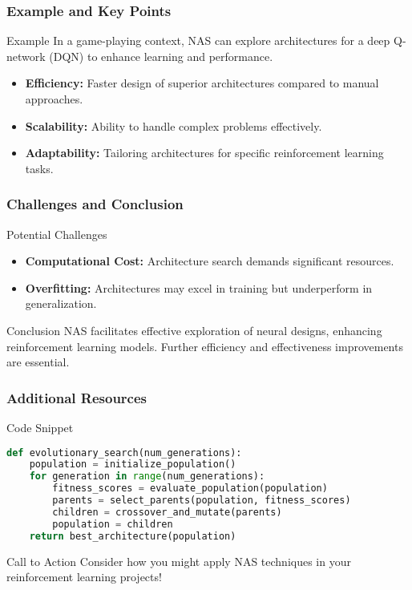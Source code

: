 \documentclass[aspectratio=169]{beamer}
\begin{document}
\begin{frame}[fragile]
    \frametitle{Example and Key Points}
    \begin{block}{Example}
        In a game-playing context, NAS can explore architectures for a deep Q-network (DQN) to enhance learning and performance.
    \end{block}
    
    \begin{itemize}
        \item \textbf{Efficiency:} Faster design of superior architectures compared to manual approaches.
        \item \textbf{Scalability:} Ability to handle complex problems effectively.
        \item \textbf{Adaptability:} Tailoring architectures for specific reinforcement learning tasks.
    \end{itemize}
\end{frame}

\begin{frame}[fragile]
    \frametitle{Challenges and Conclusion}
    \begin{block}{Potential Challenges}
        \begin{itemize}
            \item \textbf{Computational Cost:} Architecture search demands significant resources.
            \item \textbf{Overfitting:} Architectures may excel in training but underperform in generalization.
        \end{itemize}
    \end{block}
    
    \begin{block}{Conclusion}
        NAS facilitates effective exploration of neural designs, enhancing reinforcement learning models. Further efficiency and effectiveness improvements are essential.
    \end{block}
\end{frame}

\begin{frame}[fragile]
    \frametitle{Additional Resources}
    \begin{block}{Code Snippet}
    \begin{lstlisting}[language=Python]
def evolutionary_search(num_generations):
    population = initialize_population()
    for generation in range(num_generations):
        fitness_scores = evaluate_population(population)
        parents = select_parents(population, fitness_scores)
        children = crossover_and_mutate(parents)
        population = children
    return best_architecture(population)
    \end{lstlisting}
    \end{block}
    
    \begin{block}{Call to Action}
        Consider how you might apply NAS techniques in your reinforcement learning projects!
    \end{block}
\end{frame}
\end{document}
